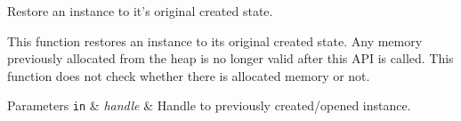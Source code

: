 Restore an instance to it's original created state. 

This function restores an instance to its original created state. Any memory previously allocated from the heap is no longer valid after this API is called. This function does not check whether there is allocated memory or not.


\begin{DoxyParams}[1]{Parameters}
\mbox{\tt in}  & {\em handle} & Handle to previously created/opened instance. \\
\hline
\end{DoxyParams}
